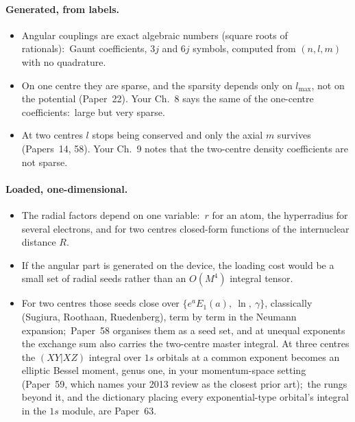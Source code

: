 \documentclass[11pt]{article}
\begin{document}
\paragraph{Generated, from labels.}
\begin{itemize}
\item Angular couplings are exact algebraic numbers (square roots of
rationals):\ Gaunt coefficients, $3j$ and $6j$ symbols, computed from
$(n,l,m)$ with no quadrature.
\item On one centre they are sparse, and the sparsity depends only on
$l_{\max}$, not on the potential (Paper~22). Your Ch.~8 says the same of the
one-centre coefficients:\ large but very sparse.
\item At two centres $l$ stops being conserved and only the axial $m$
survives (Papers~14, 58). Your Ch.~9 notes that the two-centre density
coefficients are not sparse.
\end{itemize}

\paragraph{Loaded, one-dimensional.}
\begin{itemize}
\item The radial factors depend on one variable:\ $r$ for an atom, the
hyperradius for several electrons, and for two centres closed-form
functions of the internuclear distance $R$.
\item If the angular part is generated on the device, the loading cost would
be a small set of radial seeds rather than an $O(M^4)$ integral tensor.
\item For two centres those seeds close over $\{e^aE_1(a),\ \ln,\ \gamma\}$,
classically (Sugiura, Roothaan, Ruedenberg), term by term in the Neumann
expansion;\ Paper~58 organises them as a seed set, and at unequal exponents the
exchange sum also carries the two-centre master integral. At three centres the $(XY|XZ)$ integral over $1s$ orbitals at
a common exponent becomes an elliptic Bessel moment, genus one, in your
momentum-space setting (Paper~59, which names your 2013 review as the
closest prior art);\ the rungs beyond it, and the dictionary placing every exponential-type
orbital's integral in the $1s$ module, are Paper~63.
\end{itemize}
\end{document}
